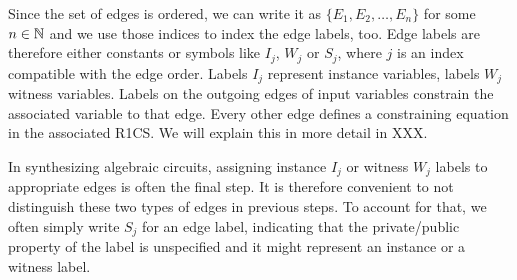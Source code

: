 Since the set of edges is ordered, we can write it as $\{E_1,E_2,\ldots, E_n\}$ for some $n\in \mathbb{N}$ and we use those indices to index the edge labels, too. Edge labels are therefore either constants or symbols like $I_j$, $W_j$ or $S_j$, where $j$ is an index compatible with the edge order. Labels $I_j$ represent instance variables, labels $W_j$ witness variables. Labels on the outgoing edges of input variables constrain the associated variable to that edge. Every other edge defines a constraining equation in the associated R1CS. We will explain this in more detail in XXX.
\begin{notation}
In synthesizing algebraic circuits, assigning instance $I_j$ or witness $W_j$ labels to appropriate edges is often the final step. It is therefore convenient to not distinguish these two types of edges in previous steps. To account for that, we often simply write $S_j$ for an edge label, indicating that the private/public property of the label is unspecified and it might represent an instance or a witness label. 
\end{notation}
